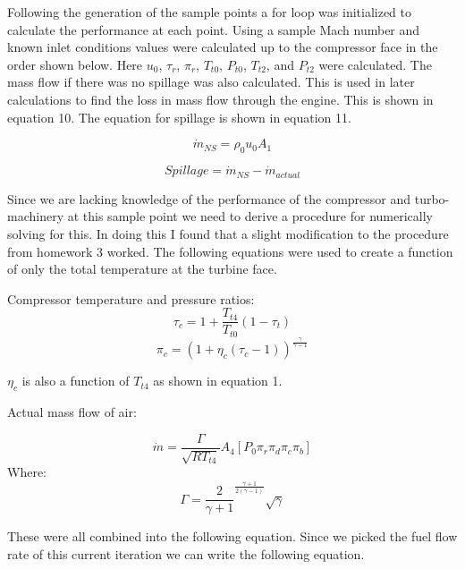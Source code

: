 \documentclass[journal ]{new-aiaa}
\begin{document}
Following the generation of the sample points a for loop was initialized to calculate the performance at each point.
Using a sample Mach number and known inlet conditions values were calculated up to the compressor face in the order shown below. Here $u_0$, $\tau_r$, $\pi_r$, $T_{t0}$, $P_{t0}$, $T_{t2}$, and $P_{t2}$ were calculated.
The mass flow if there was no spillage was also calculated. This is used in later calculations to find the loss in mass flow through the engine. This is shown in equation 10. The equation for spillage is shown in equation 11.

\begin{equation}
    \dot{m}_{NS} = \rho_0 u_0 A_1
\end{equation} 

\begin{equation}
    Spillage = \dot{m}_{NS} - \dot{m}_{actual}
\end{equation} 

Since we are lacking knowledge of the performance of the compressor and turbo-machinery at this sample point we need to derive a procedure for numerically solving for this. In doing this I found that a slight modification to the procedure from homework 3 worked. The following equations were used to create a function of only the total temperature at the turbine face.

\noindent Compressor temperature and pressure ratios:
\begin{equation}
    \tau_c = 1+\frac{T_{t4}}{T_{t0}} \left(1-\tau_t\right)
\end{equation} 
\begin{equation}
    \pi_c = \left(1+\eta_c \left(\tau_c-1\right)\right)^\frac{\gamma}{\gamma-1}
\end{equation} 

\noindent $\eta_c$ is also a function of $T_{t4}$ as shown in equation 1.

\noindent Actual mass flow of air:

\begin{equation}
    \dot{m} = \frac{\Gamma}{\sqrt{R T_{t4}}} A_4 \left[P_0 \pi_r \pi_d \pi_c \pi_b\right]
\end{equation} 
\noindent Where:
\begin{equation}
    \Gamma = \frac{2}{\gamma+1}^{\frac{\gamma+1}{2(\gamma-1)}} \sqrt{\gamma}
\end{equation} 

These were all combined into the following equation. Since we picked the fuel flow rate of this current iteration we can write the following equation.
\end{document}
